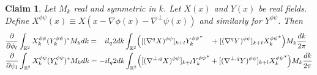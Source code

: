 \documentclass[noinfoline]{imsart}
\newtheorem{claim}{Claim}
\begin{document}
\begin{claim} Let $M_{k}$ real and symmetric in $k$. Let $X(x)$ and $Y(x)$ be real fields. Define $X^{\phi\psi}(x)\equiv X(x - \nabla \phi(x) - \nabla^\perp \psi(x))$ and similarly for $Y^{\phi\psi}$. Then
\begin{align*}
&\frac{\partial}{\partial \phi_l}  \int_{\Bbb R^2}   X^{\phi\psi}_k (Y^{\phi\psi}_k)^* M_kdk =
\phantom{-}il_q 2dk \int_{\Bbb R^2}\Bigl( [(\nabla^q X)^{\phi\psi}]_{k+l} {Y^{\phi\psi}_k}^* \,\,\,\,\,\,+ [(\nabla^q Y)^{\phi\psi}]_{k+l} {X^{\phi\psi}_k}^*\Bigr) M_k \frac{dk}{2\pi} \\
&\frac{\partial}{\partial \psi_l}  \int_{\Bbb R^2}   X^{\phi\psi}_k (Y^{\phi\psi}_k)^* M_kdk =
-il_q {2dk} \int_{\Bbb R^2}\Bigl( [(\nabla^{\perp,q} X)^{\phi\psi}]_{k+l} {Y^{\phi\psi}_k}^* + [(\nabla^{\perp,q} Y)^{\phi\psi}]_{k+l} {X^{\phi\psi}_k}^*\Bigr) M_k\frac{dk}{2\pi}
\end{align*}
\end{claim}
\end{document}
